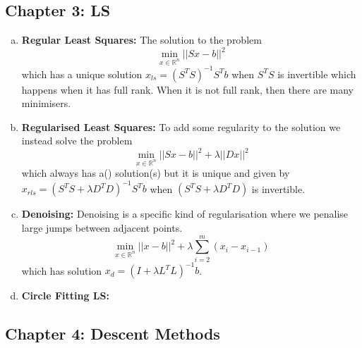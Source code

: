 \documentclass{article}
\begin{document}
\subsection*{Chapter 3: LS}

\begin{enumerate} [a.]
    \item \textbf{Regular Least Squares:} The solution to the problem 
    \[
    \min_{x \in \mathbb{R}^n} ||Sx-b||^2
    \]
    which has a unique solution \(x_{ls} = (S^TS)^{-1}S^Tb\) when \(S^TS\) is invertible which happens when it has full rank. When it is not full rank, then there are many minimisers.
    
    \item \textbf{Regularised Least Squares:} To add some regularity to the solution we instead solve the problem
    \[
    \min_{x \in \mathbb{R}^n} ||Sx-b||^2 + \lambda||Dx||^2
    \]
    which always has a() solution(s) but it is unique and given by \(x_{rls}= (S^TS+\lambda D^TD)^{-1}S^Tb\) when \((S^TS+\lambda D^TD)\) is invertible.

    \item \textbf{Denoising:} Denoising is a specific kind of regularisation where we penalise large jumps between adjacent points.
    \[
    \min_{x \in \mathbb{R}^n} ||x-b||^2 + \lambda \sum_{i=2}^m(x_i-x_{i-1})
    \]
    which has solution \(x_{d} = (I + \lambda L^TL)^{-1}b\).

    \item \textbf{Circle Fitting LS: }
\end{enumerate}

\subsection*{Chapter 4: Descent Methods}
\end{document}
